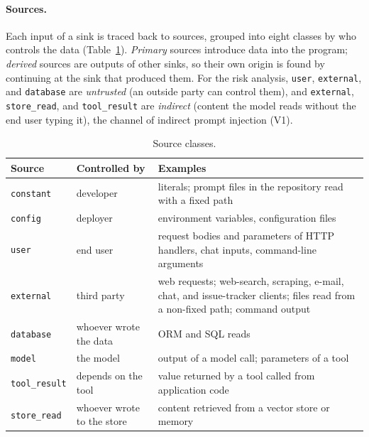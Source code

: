 \paragraph{Sources.} Each input of a sink is traced back to sources, grouped into eight classes by who controls the data (Table~\ref{tab:df-sources}). \emph{Primary} sources introduce data into the program; \emph{derived} sources are outputs of other sinks, so their own origin is found by continuing at the sink that produced them. For the risk analysis, \texttt{user}, \texttt{external}, and \texttt{database} are \emph{untrusted} (an outside party can control them), and \texttt{external}, \texttt{store\_read}, and \texttt{tool\_result} are \emph{indirect} (content the model reads without the end user typing it), the channel of indirect prompt injection (V1).

\begin{table}[t]
\centering
\footnotesize
\renewcommand{\arraystretch}{1.2}
\setlength{\tabcolsep}{4pt}
\caption{Source classes.}
\label{tab:df-sources}
\begin{tabular}{@{}>{\raggedright\arraybackslash}p{}>{\raggedright\arraybackslash}p{}>{\raggedright\arraybackslash}p{}@{}}
\toprule
\textbf{Source} & \textbf{Controlled by} & \textbf{Examples} \\
\midrule
\texttt{constant} & developer & literals; prompt files in the repository read with a fixed path \\
\texttt{config} & deployer & environment variables, configuration files \\
\texttt{user} & end user & request bodies and parameters of HTTP handlers, chat inputs, command-line arguments \\
\texttt{external} & third party & web requests; web-search, scraping, e-mail, chat, and issue-tracker clients; files read from a non-fixed path; command output \\
\texttt{database} & whoever wrote the data & ORM and SQL reads \\
\midrule
\texttt{model} & the model & output of a model call; parameters of a tool \\
\texttt{tool\_result} & depends on the tool & value returned by a tool called from application code \\
\texttt{store\_read} & whoever wrote to the store & content retrieved from a vector store or memory \\
\bottomrule
\end{tabular}
\end{table}


